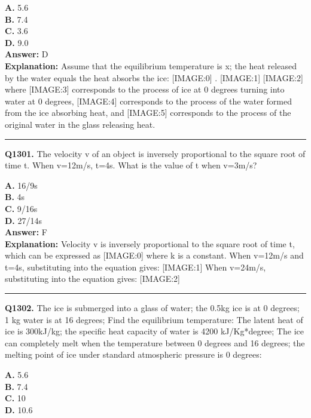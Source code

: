 \documentclass[12pt]{article}
\begin{document}
\textbf{A.} 5.6 \\
\textbf{B.} 7.4 \\
\textbf{C.} 3.6 \\
\textbf{D.} 9.0 \\

\textbf{Answer:} D \\
\textbf{Explanation:} Assume that the equilibrium temperature is x; the heat released by the water equals the heat absorbs the ice:
[IMAGE:0]
.
[IMAGE:1]
[IMAGE:2]
where
[IMAGE:3]
corresponds to the process of ice at 0 degrees turning into water at 0 degrees,
[IMAGE:4]
corresponds to the process of the water formed from the ice absorbing heat, and
[IMAGE:5]
corresponds to the process of the original water in the glass releasing heat.

\hrule
\vspace{1em}


\noindent
\textbf{Q1301.} The velocity v of an object is inversely proportional to the square root of time t. When v=12m/s, t=4s. What is the value of t when v=3m/s?



\textbf{A.} 16/9s \\
\textbf{B.} 4s \\
\textbf{C.} 9/16s \\
\textbf{D.} 27/14s \\

\textbf{Answer:} F \\
\textbf{Explanation:} Velocity v is inversely proportional to the square root of time t, which can be expressed as
[IMAGE:0]
where k is a constant. When v=12m/s and t=4s, substituting into the equation gives:
[IMAGE:1]
When v=24m/s, substituting into the equation gives:
[IMAGE:2]

\hrule
\vspace{1em}


\noindent
\textbf{Q1302.} The ice is submerged into a glass of water; the 0.5kg ice is at 0 degrees; 1 kg water is at 16 degrees; Find the equilibrium temperature: The latent heat of ice is 300kJ/kg; the specific heat capacity of water is 4200 kJ/Kg*degree; The ice can completely melt when the temperature between 0 degrees and 16 degrees; the melting point of ice under standard atmospheric pressure is 0 degrees:



\textbf{A.} 5.6 \\
\textbf{B.} 7.4 \\
\textbf{C.} 10 \\
\textbf{D.} 10.6 \\
\end{document}
